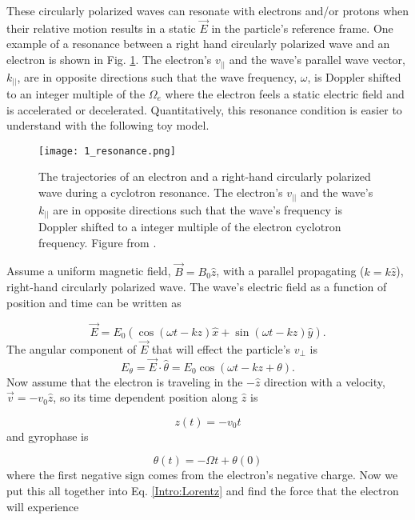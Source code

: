 These circularly polarized waves can resonate with electrons and/or protons when their relative motion results in a static $\vec{E}$ in the particle's reference frame. One example of a resonance between a right hand circularly polarized wave and an electron is shown in Fig. \ref{Intro:resonance_diagram}. The electron's $v_{||}$ and the wave's parallel wave vector, $k_{||}$, are in opposite directions such that the wave frequency, $\omega$, is Doppler shifted to an integer multiple of the $\Omega_e$ where the electron feels a static electric field and is accelerated or decelerated. Quantitatively, this resonance condition is easier to understand with the following toy model.

\begin{figure}
\texttt{[image: 1\_resonance.png]}
\caption{The trajectories of an electron and a right-hand circularly polarized wave during a cyclotron resonance. The electron's $v_{||}$ and the wave's $k_{||}$ are in opposite directions such that the wave's frequency is Doppler shifted to a integer multiple of the electron cyclotron frequency. Figure from \citep{Tsurutani1997}.}
\label{Intro:resonance_diagram}
\end{figure}

Assume a uniform magnetic field, $\vec{B} = B_0 \hat{z}$, with a parallel propagating ($k = k\hat{z}$), right-hand circularly polarized wave. The wave's electric field as a function of position and time can be written as

\begin{equation}
\vec{E} = E_0 (\cos{(\omega t - kz)}\hat{x} + \sin{(\omega t - kz)}\hat{y}).
\end{equation} The angular component of $\vec{E}$ that will effect the particle's $v_\perp$ is 
\begin{equation}
E_\theta = \vec{E} \cdot \hat{\theta} = E_0 \cos{(\omega t - kz + \theta)}.
\end{equation} Now assume that the electron is traveling in the $-\hat{z}$ direction with a velocity, $\vec{v} = -v_0 \hat{z}$, so its time dependent position along $\hat{z}$ is

\begin{equation}
z(t) = -v_0 t
\end{equation} and gyrophase is

\begin{equation}
\theta(t) = -\Omega t + \theta(0)
\end{equation} where the first negative sign comes from the electron's negative charge. Now we put this all together into Eq. \ref{Intro:Lorentz} and find the force that the electron will experience

